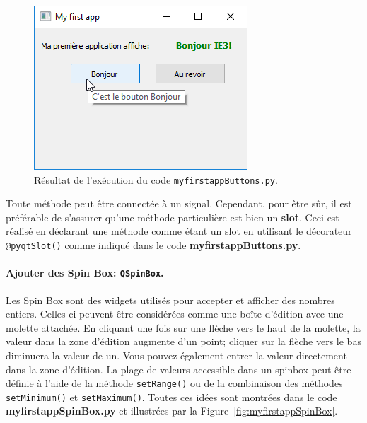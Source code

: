 \documentclass[%
oneside,                 %
final,                   %
10pt,french]{article}
\begin{document}
\begin{figure}[!ht]  %
  \centerline{\includegraphics[width=0.4\linewidth]{imgs/myfirstappButtons1.png}}
  \caption{
  Résultat de l'exécution du code \texttt{myfirstappButtons.py}. \label{fig:myfirstappButtons}
  }
\end{figure}


Toute méthode peut être connectée à un signal. Cependant, pour être sûr, il est préférable de s’assurer qu’une méthode particulière est bien un \textbf{slot}. Ceci est réalisé en déclarant une méthode comme étant un slot en utilisant le décorateur \texttt{@pyqtSlot()} comme indiqué dans le code \textbf{myfirstappButtons.py}.

\paragraph{Ajouter des Spin Box: \texttt{QSpinBox}.}
Les Spin Box sont des widgets utilisés pour accepter et afficher des nombres entiers. Celles-ci peuvent être considérées comme une boîte d'édition avec une molette attachée. En cliquant une fois sur une flèche vers le haut de la molette, la valeur dans la zone d'édition augmente d'un point; cliquer sur la flèche vers le bas diminuera la valeur de un. Vous pouvez également entrer la valeur directement dans la zone d'édition. La plage de valeurs accessible dans un spinbox peut être définie à l'aide de la méthode \texttt{setRange()} ou de la combinaison des méthodes \texttt{setMinimum()} et \texttt{setMaximum()}. Toutes ces idées sont montrées dans le code \textbf{myfirstappSpinBox.py} et illustrées par la Figure~\ref{fig:myfirstappSpinBox}.
\end{document}
